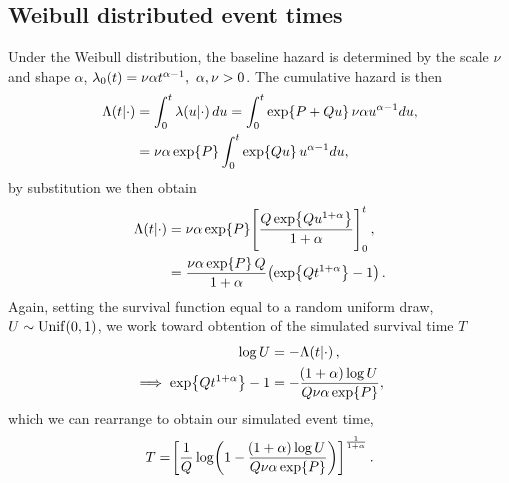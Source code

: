 \subsection*{Weibull distributed event times}
Under the Weibull distribution, the baseline hazard is determined by the scale $\nu$ and shape $\alpha$, $\lo(t)=\nu\alpha t^{\alpha-1},\ \alpha,\nu>0$. The cumulative hazard is then
\begin{align*}
    \Lambda\!\left( t|\cdot\right)&=\int_0^t\lambda\!\left( u|\cdot\right) du=\int_0^t\exp\!\left\{ P + Qu\right\}\nu\alpha u^{\alpha-1}du,\\
    &=\nu\alpha\exp\!\left\{ P \right\}\int_0^t\exp\!\left\{ Qu\right\} u^{\alpha-1}du,
\end{align*}
by substitution we then obtain \citep{Austin2012}
\begin{align*}
    \Lambda\!\left( t|\cdot\right)&=\nu\alpha\exp\!\left\{ P\right\}\!\left[\frac{Q\exp\!\left\{ Qu^{1+\alpha}\right\}}{1+\alpha}\right]_0^t,\\
    &=\frac{\nu\alpha\exp\!\left\{ P\right\} Q}{1+\alpha}\!\left(\exp\!\left\{ Qt^{1+\alpha}\right\}-1\right).
\end{align*}
Again, setting the survival function equal to a random uniform draw, $U\sim \mathrm{Unif}\!\left( 0, 1\right)$, we work toward obtention of the simulated survival time $T$
\begin{align*}
    \log U &= -\Lambda\!\left( t|\cdot\right),\\
    \implies\exp\!\left\{ Qt^{1+\alpha}\right\}-1&=-\frac{\!\left( 1 + \alpha\right) \log U}{Q\nu\alpha\exp\!\left\{ P \right\}},
\end{align*}
which we can rearrange to obtain our simulated event time,
\begin{equation}
    T=\!\left[\frac{1}{Q}\log\!\left(1-\frac{\!\left(1+\alpha\right)\log U}{Q\nu\alpha\exp\!\left\{ P\right\}}\right)\right]^{\frac{1}{1+\alpha}}.
\end{equation}

